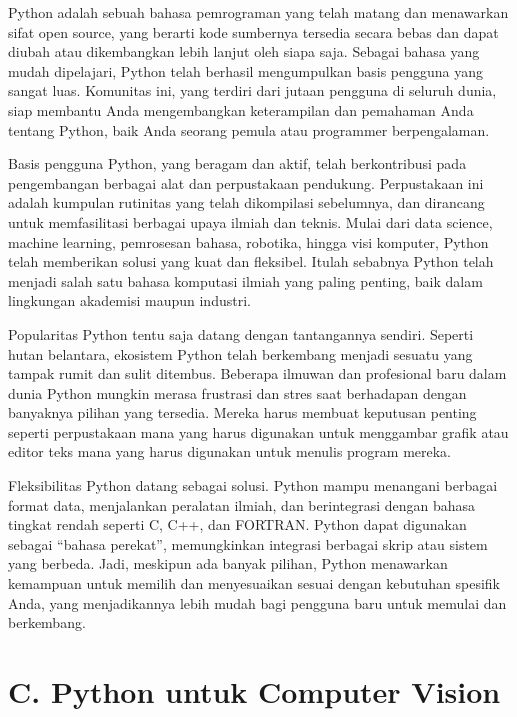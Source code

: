 \documentclass[
  letterpaper,
  DIV=11,
  numbers=noendperiod]{scrreprt}
\begin{document}
Python adalah sebuah bahasa pemrograman yang telah matang dan menawarkan
sifat open source, yang berarti kode sumbernya tersedia secara bebas dan
dapat diubah atau dikembangkan lebih lanjut oleh siapa saja. Sebagai
bahasa yang mudah dipelajari, Python telah berhasil mengumpulkan basis
pengguna yang sangat luas. Komunitas ini, yang terdiri dari jutaan
pengguna di seluruh dunia, siap membantu Anda mengembangkan keterampilan
dan pemahaman Anda tentang Python, baik Anda seorang pemula atau
programmer berpengalaman.

Basis pengguna Python, yang beragam dan aktif, telah berkontribusi pada
pengembangan berbagai alat dan perpustakaan pendukung. Perpustakaan ini
adalah kumpulan rutinitas yang telah dikompilasi sebelumnya, dan
dirancang untuk memfasilitasi berbagai upaya ilmiah dan teknis. Mulai
dari data science, machine learning, pemrosesan bahasa, robotika, hingga
visi komputer, Python telah memberikan solusi yang kuat dan fleksibel.
Itulah sebabnya Python telah menjadi salah satu bahasa komputasi ilmiah
yang paling penting, baik dalam lingkungan akademisi maupun industri.

Popularitas Python tentu saja datang dengan tantangannya sendiri.
Seperti hutan belantara, ekosistem Python telah berkembang menjadi
sesuatu yang tampak rumit dan sulit ditembus. Beberapa ilmuwan dan
profesional baru dalam dunia Python mungkin merasa frustrasi dan stres
saat berhadapan dengan banyaknya pilihan yang tersedia. Mereka harus
membuat keputusan penting seperti perpustakaan mana yang harus digunakan
untuk menggambar grafik atau editor teks mana yang harus digunakan untuk
menulis program mereka.

Fleksibilitas Python datang sebagai solusi. Python mampu menangani
berbagai format data, menjalankan peralatan ilmiah, dan berintegrasi
dengan bahasa tingkat rendah seperti C, C++, dan FORTRAN. Python dapat
digunakan sebagai ``bahasa perekat'', memungkinkan integrasi berbagai
skrip atau sistem yang berbeda. Jadi, meskipun ada banyak pilihan,
Python menawarkan kemampuan untuk memilih dan menyesuaikan sesuai dengan
kebutuhan spesifik Anda, yang menjadikannya lebih mudah bagi pengguna
baru untuk memulai dan berkembang.

\hypertarget{c.-python-untuk-computer-vision}{%
\section*{C. Python untuk Computer
Vision}\label{c.-python-untuk-computer-vision}}
\end{document}
